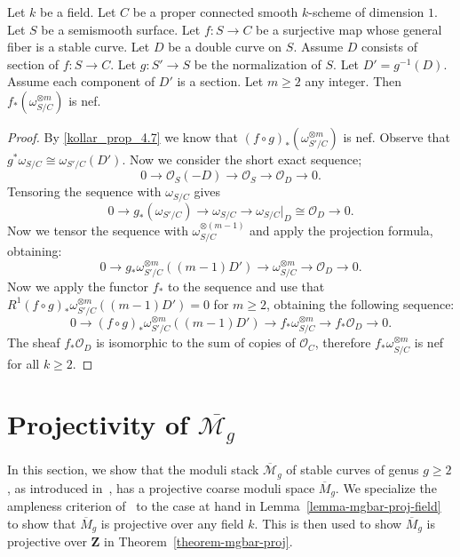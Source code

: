 \begin{lemma}
\label{kollar-theorem-4.9}
Let $k$ be a field.
Let $C$ be a proper connected smooth $k$-scheme of dimension $1$.
Let $S$ be a semismooth surface.
Let $f:S\to C$ be a surjective map whose general fiber is a stable curve.
Let $D$ be a double curve on $S$.
Assume $D$ consists of section of $f:S\to C$.
Let $g:S'\to S$ be the normalization of $S$.
Let $D'=g^{-1}(D)$.
Assume each component of $D'$ is a section.
Let $m\geq 2$ any integer.
Then $f_*(\omega_{S/C}^{\otimes m})$ is nef.
\end{lemma}
\begin{proof}
By \ref{kollar_prop_4.7}
we know that $(f\circ g)_*(\omega_{S'/C}^{\otimes m})$ is nef.
Observe that $g^*\omega_{S/C}\cong \omega_{S'/C}(D')$.
Now we consider the short exact sequence;
$$
0 \to \mathcal{O}_{S}(-D) \to \mathcal{O}_S \to \mathcal{O}_D \to 0.
$$
Tensoring the sequence with $\omega_{S/C}$ gives
$$
0 \to g_*(\omega_{S'/C}) \to \omega_{S/C} \to \omega_{S/C}\rvert_D \cong \mathcal{O}_D \to 0.
$$
Now we tensor the sequence with $\omega_{S/C}^{\otimes (m-1)}$ and apply the
projection formula, obtaining:
$$
0 \to g_*\omega_{S'/C}^{\otimes m}((m-1)D') \to \omega_{S/C}^{\otimes m}\to \mathcal{O}_D\to 0.
$$
Now we apply the functor $f_*$ to the sequence and use that
$R^1(f\circ g)_*\omega_{S'/C}^{\otimes m}((m-1)D')=0$ for $m\geq 2$,
obtaining the following sequence:
$$
  0 \to
  (f\circ g)_*\omega_{S'/C}^{\otimes m}((m-1)D') \to
  f_*\omega_{S/C}^{\otimes m} \to
  f_*\mathcal{O}_D \to
  0.
$$
The sheaf $f_*\mathcal{O}_D$ is isomorphic to the sum of copies of
$\mathcal{O}_C$, therefore $f_*\omega_{S/C}^{\otimes m}$ is nef for
all $k\geq 2$.
\end{proof}

\section{Projectivity of $\overline{\mathcal{M}_g}$}
In this section, we show that the moduli stack $\overline{\mathcal{M}}_g$ of
stable curves of genus $g \geq 2$, as introduced in~, has a
projective coarse moduli space $\overline{M}_g$.
We specialize the ampleness criterion of~\cite[Theorem 2.6]{ko90} to the case
at hand in Lemma~\ref{lemma-mgbar-proj-field} to show that $\overline{M}_g$
is projective over any field $k$.
This is then used to show $\overline{M}_g$ is projective over $\mathbf{Z}$
in Theorem~\ref{theorem-mgbar-proj}.

